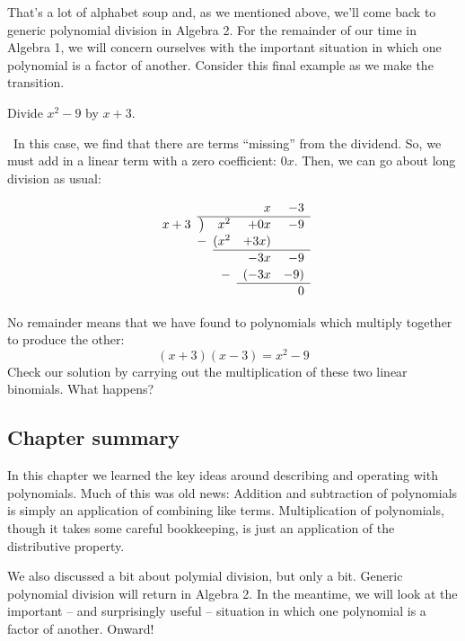 That's a lot of alphabet soup and, as we mentioned above, we'll come back to generic polynomial division in Algebra 2. For the remainder of our time in Algebra 1, we will concern ourselves with the important situation in which one polynomial is a factor of another. Consider this final example as we make the transition.

\begin{boxedex}
Divide $x^2-9$ by $x+3$.

\exsoln\ In this case, we find that there are terms ``missing'' from the dividend. So, we must add in a linear term with a zero coefficient: $0x$. Then, we can go about long division as usual:

\[
\renewcommand\arraystretch{1.1}
\begin{array}{*1r @{\hskip\arraycolsep}c@{\hskip\arraycolsep} *3r}
		&	~	&&x&-3\\
\cline{2-5}
x+3	&\big)	&x^2&+0x&-9\\
		&-		&(x^2&+3x)\\
\cline{3-5}
		&		&&-3x&-9\\
		&		&-&(-3x&-9)\\
\cline{4-5}
		&		&&&0
\end{array}
\]

No remainder means that we have found to polynomials which multiply together to produce the other:
\[(x+3)(x-3) = x^2 - 9\]
Check our solution by carrying out the multiplication of these two linear binomials. What happens?
\end{boxedex}

\subsection*{Chapter summary}

In this chapter we learned the key ideas around describing and operating with polynomials. Much of this was old news: Addition and subtraction of polynomials is simply an application of combining like terms. Multiplication of polynomials, though it takes some careful bookkeeping, is just an application of the distributive property.

We also discussed a bit about polymial division, but only a bit. Generic polynomial division will return in Algebra 2. In the meantime, we will look at the important -- and surprisingly useful -- situation in which one polynomial is a factor of another. Onward!
